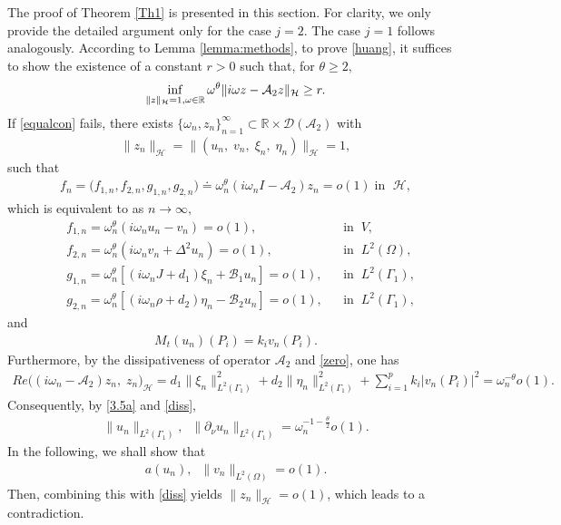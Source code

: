 \documentclass[twoside]{article}
\theoremstyle{noparens}
\theoremstyle{definition}
\numberwithin{equation}{section}
\numberwithin{figure}{section}
\begin{document}
The proof of Theorem \ref{Th1} is presented in this section. For clarity, we only provide the detailed argument only for the case  $j=2$. The case $j=1$ follows analogously.
According to Lemma \ref{lemma:methods}, to prove \eqref{huang}, it suffices to show the existence of a constant $r > 0$ such that, for  $\theta\ge2 , $
\begin{align}\label{equalcon}
	\inf_{\|z\|_{\cal H}=1,\omega\in\mathbb{R}}\omega^{\theta}\|i\omega z-\mathcal{A}_2 z\|_{\mathcal{H}}\geq r.
\end{align}
If \eqref{equalcon} fails, there exists $\{\omega_{n},z_{n}\}_{n=1}^{\infty}\subset\mathbb{R}\times \mathcal{D}(\mathcal{A}_2)$ with
\begin{align}\label{unitnorm}
	\|z_{n}\|_{\mathcal{H}}=\|(u_{n},\;v_{n},\;\xi_{n},\;\eta_{n})\|_{\mathcal{H}}=1,
\end{align}
such that
\begin{align}\label{zero}
	f_{n } = \big(f_{1,n},f_{2,n},g_{1,n},g_{2,n}\big) \doteq \omega_{n}^{\theta}(i\omega_{n}I-\mathcal{A}_2)z_{n} = o(1) \;  \mbox{in } \; \mathcal{H},
\end{align}
which is equivalent to as $n\to \infty,$
\begin{subequations}
	\begin{align}
		&f_{1,n}=\omega_{n}^{\theta}(i\omega_{n}u_{n}-v_{n})=o(1), &&  \mbox{in} \;\; V,\label{3.5a}\\
		&f_{2,n}=\omega_{n}^{\theta}(i\omega_{n}v_{n}+\Delta^{2}u_{n})=o(1), & & \mbox{in} \;\; L^{2}(\Omega),\label{3.5b}\\
		& g_{1,n}=\omega_{n}^{\theta}[(i\omega_{n}J+d_1)\xi_{n}+\mathcal{B}_{1}u_{n}]=o(1), & & \mbox{in} \;\; L^{2}(\Gamma_{1}),\label{3.5c}\\
		& g_{2,n}=\omega_{n}^{\theta}[(i\omega_{n}\rho+d_2)\eta_{n}-\mathcal{B}_{2}u_{n}]=o(1),
		& &  \mbox{in} \;\; L^{2}(\Gamma_{1})\label{3.5d},
	\end{align}
\end{subequations}
and
\begin{align}\label{35e}
	M_t(u_n)(P_i) = k_i v_n (P_i) .
\end{align}
Furthermore, by the dissipativeness of operator $\mathcal{A}_2$ and \eqref{zero}, one has
\begin{align} \label{diss}
	Re\big((i\omega_{n}-\mathcal{A}_2)z_{n},\; z_{n}\big)_{\mathcal H}
	=d_1\|\xi_{n}\|_{L^2(\Gamma_{1})}^{2}
	+d_2\|\eta_{n}\|_{L^2(\Gamma_{1})}^{2}
	+\sum_{i=1}^p k_i |v_n(P_i)|^2= \omega_{n}^{-\theta}o(1).
\end{align}
Consequently, by \eqref{3.5a} and \eqref{diss},
\begin{align}\label{diss1}
	\|u_{n}\|_{L^2(\Gamma_{1})},\;\; \|\partial_\nu u_{n}\|_{L^2(\Gamma_{1})}=\omega_{n}^{-1-\frac{\theta}{2}}o(1).
\end{align}
In the following, we shall show that
\begin{align}
	a(u_{n}),\; \; \|v_{n}\|_{L^2(\Omega)}    =o(1).
\end{align}
Then, combining this with \eqref{diss} yields  $\|z_{n}\|_{\mathcal{H}}=o(1)$,
which  leads to a contradiction.
\end{document}
